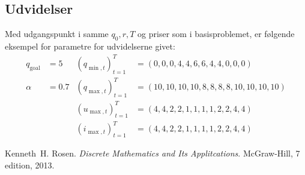 \documentclass[12pt,oneside,final]{article}
\newcommand{\1}{\mathbbm{1}}
\begin{document}
\subsection{Udvidelser}
Med udgangspunkt i samme \(q_{0}, r, T\) og priser som i basisproblemet, er følgende eksempel for parametre for udvidelserne givet:
\begin{align*}
  q_{\mathrm{goal}} & = 5   & (q_{\min,t})_{t=1}^{T} & = (0, 0, 0, 4, 4, 6, 6, 4, 4, 0, 0, 0)          \\
  \alpha            & = 0.7 & (q_{\max,t})_{t=1}^{T} & = (10, 10, 10, 10, 8, 8, 8, 8, 10, 10, 10, 10)  \\
                    &       & (u_{\max,t})_{t=1}^{T} & = (4, 4, 2, 2, 1, 1, 1, 1, 2, 2, 4, 4)          \\
                    &       & (i_{\max,t})_{t=1}^{T} & = (4, 4, 2, 2, 1, 1, 1, 1, 2, 2, 4, 4)
\end{align*}

\begin{thebibliography}{99}
  Kenneth~H. Rosen.
  \newblock \emph{Discrete {M}athematics and {I}ts {A}pplitcations}.
  \newblock McGraw-Hill, 7 edition, 2013.
\end{thebibliography}
\end{document}
